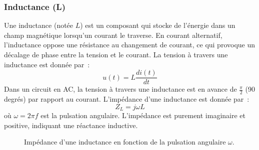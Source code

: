 \subsubsection{Inductance (L)}
Une inductance (not\'ee \(L\)) est un composant qui stocke de l'\'energie dans un champ magn\'etique lorsqu'un courant le traverse. En courant alternatif, l'inductance oppose une r\'esistance au changement de courant, ce qui provoque un d\'ecalage de phase entre la tension et le courant. La tension à travers une inductance est donn\'ee par~:
\[u(t) = L \frac{di(t)}{dt}\]
Dans un circuit en AC, la tension à travers une inductance est en avance de \(\frac{\pi}{2}\) (90 degr\'es) par rapport au courant.
L'imp\'edance d'une inductance est donn\'ee par~:
\[Z_L = j\omega L\]
o\`u \(\omega = 2\pi f\) est la pulsation angulaire. L'imp\'edance est purement imaginaire et positive, indiquant une r\'eactance inductive.
\begin{figure}[h!]
	\centering
    \caption{Imp\'edance d'une inductance en fonction de la pulsation angulaire $\omega$.}
    \label{fig:impedance_inductance}
\end{figure}

